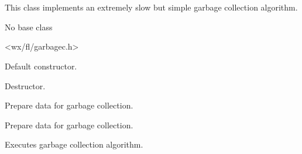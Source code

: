 %
%


\section{}\label{garbagecollector}


This class implements an extremely slow but simple garbage collection algorithm.


No base class


<wx/fl/garbagec.h>




\label{garbagecollectorgarbagecollector}


Default constructor.


\label{garbagecollectordtor}


Destructor.


\label{garbagecollectoradddependency}


Prepare data for garbage collection.


\label{garbagecollectoraddobject}


Prepare data for garbage collection.


\label{garbagecollectorarrangecollection}


Executes garbage collection algorithm.


\label{garbagecollectordestroyitemlist}


